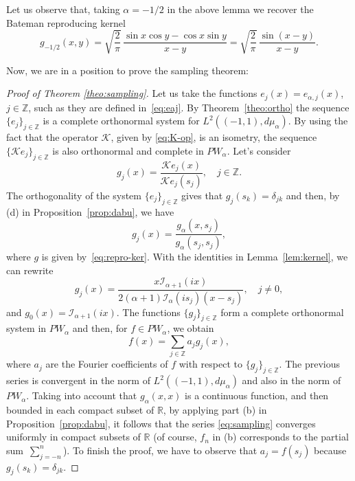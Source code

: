 \documentclass[11pt]{amsart}
\theoremstyle{plain}
\begin{document}
Let us observe that, taking $\alpha = -1/2$ in the above lemma we recover the 
Bateman reproducing kernel
\[
  g_{-1/2}(x,y) = \sqrt{\frac{2}{\pi}}\,\frac{\sin x \cos y - \cos x \sin y}{x-y}
  = \sqrt{\frac{2}{\pi}}\,\frac{\sin(x-y)}{x-y}.
\]

Now, we are in a position to prove the sampling theorem:

\begin{proof}[Proof of Theorem \ref{theo:sampling}]
Let us take the functions $e_j(x) = e_{\alpha,j}(x)$, $j\in \mathbb{Z}$,
such as they are defined in~\eqref{eq:eaj}.
By Theorem~\ref{theo:ortho} the sequence $\{e_j\}_{j\in \mathbb{Z}}$ is a complete orthonormal system for $L^2((-1,1),d\mu_\alpha)$. By using the fact that the operator $\mathcal{K}$, given by \eqref{eq:K-op}, is an isometry, the sequence $\{\mathcal{K}e_j\}_{j\in \mathbb{Z}}$ is also orthonormal and complete in $PW_\alpha$. Let's consider 
\[
  g_j(x) = \frac{\mathcal{K}e_j(x)}{\mathcal{K}e_j(s_j)},
  \quad j\in \mathbb{Z}. 
\]
The orthogonality of the system $\{e_j\}_{j\in \mathbb{Z}}$ gives that $g_j(s_k) = \delta_{jk}$ and then, by (d) in Proposition~\ref{prop:dabu}, we have
\[
  g_j(x) = \frac{g_\alpha(x,s_j)}{g_\alpha(s_j,s_j)},
\]
where $g$ is given by~\eqref{eq:repro-ker}. With the identities in Lemma~\ref{lem:kernel}, we can rewrite
\[
  g_j(x) = \frac{x\mathcal{I}_{\alpha+1}(ix)}
    {2(\alpha+1)\mathcal{I}_{\alpha}(is_j)(x-s_j)},
    \quad j\ne 0,
\]
and $g_0(x) = \mathcal{I}_{\alpha+1}(ix)$.
The functions $\{g_j\}_{j\in \mathbb{Z}}$ form a complete orthonormal system in $PW_\alpha$ and then, for $f\in PW_\alpha$, we obtain 
\begin{equation}
\label{eq:sampling}
  f(x) = \sum_{j\in \mathbb{Z}} a_j g_j(x),
\end{equation}
where $a_j$ are the Fourier coefficients of $f$ with respect to $\{g_j\}_{j\in \mathbb{Z}}$. The previous series is convergent in the norm of $L^2((-1,1),d\mu_\alpha)$ and also in the norm of $PW_\alpha$. Taking into account that $g_\alpha(x,x)$ is a continuous function, and then bounded in each compact subset of $\mathbb{R}$, by applying part (b) in Proposition~\ref{prop:dabu}, it follows that the series \eqref{eq:sampling} converges uniformly in compact subsets of $\mathbb{R}$ (of course, $f_n$ in (b) corresponds to the partial sum~$\sum_{j=-n}^n$). To finish the proof, we have to observe that $a_j = f(s_j)$ because $g_j(s_k) = \delta_{jk}$.
\end{proof}

\end{document}
